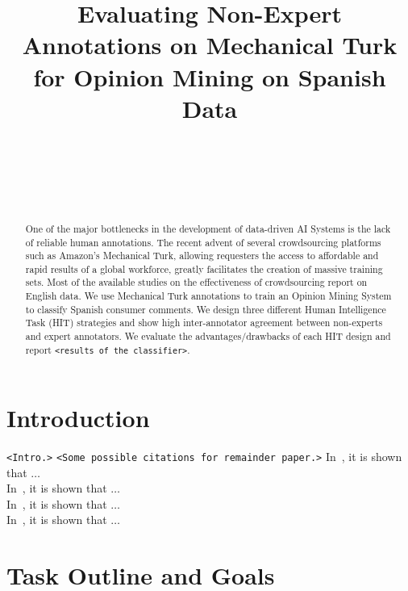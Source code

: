 \documentclass[11pt,letterpaper]{article}
\title{Evaluating Non-Expert Annotations on Mechanical Turk for Opinion Mining on Spanish Data}
\author{\\
  \\
  \\
  \\
  }
\date{}
\begin{document}
\maketitle
\begin{abstract}
  One of the major bottlenecks in the development of data-driven AI Systems is the lack of reliable human annotations. The recent advent of several crowdsourcing platforms such as Amazon's Mechanical Turk, allowing requesters the access to affordable and rapid results of a global workforce, greatly facilitates the creation of massive training sets. Most of the available studies on the effectiveness of crowdsourcing report on English data. We use Mechanical Turk annotations to train an Opinion Mining System to classify Spanish consumer comments. We design three different Human Intelligence Task (HIT) strategies and show high inter-annotator agreement between non-experts and expert annotators. We evaluate the advantages/drawbacks of each HIT design and report \texttt{<results of the classifier>}.
\end{abstract}

\section{Introduction}
\label{sect:intro}
\texttt{<Intro.>}
\texttt{<Some possible citations for remainder paper.>}
In~\cite{snow_cheap_2008}, it is shown that $\ldots$ \\
In~\cite{sheng_get_2008}, it is shown that $\ldots$ \\
In~\cite{kittur_crowdsourcing_2008}, it is shown that $\ldots$ \\
In~\cite{su_internet-scale_2007}, it is shown that $\ldots$ \\

\section{Task Outline and Goals}
\label{sect:outline}
\end{document}
